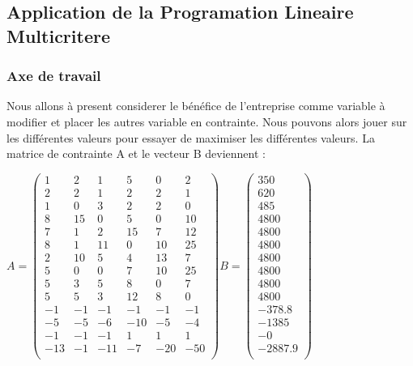 \documentclass[a4paper, 11pt]{article}
\begin{document}
\subsection{Application de la Programation Lineaire Multicritere}
\subsubsection{Axe de travail}

Nous allons à present considerer le bénéfice de l’entreprise comme variable à modifier et placer les autres variable en contrainte. Nous pouvons alors jouer sur les différentes valeurs pour essayer de maximiser les différentes valeurs.
La matrice de contrainte A et le vecteur B deviennent : 

$ A = \begin{pmatrix}
1 &2 &1 &5 &0 &2\\
2 &2 &1 &2 &2 &1\\
1 &0 &3 &2 &2 &0\\
8 &15 &0 &5 &0 &10\\
7 &1 &2 &15 &7 &12\\
8 &1 &11 &0 &10 &25\\
2 &10 &5 &4 &13 &7\\
5 &0 &0 &7 &10 &25\\
5 &3 &5 &8 &0 &7\\
5 &5 &3 &12 &8 &0\\
-1 &-1 &-1 &-1 &-1 &-1\\      %
-5 &-5 &-6 &-10 &-5 &-4\\     %
-1 &-1 &-1 &1 &1 &1\\         %
-13 &-1 &-11 &-7 &-20 &-50\\  %
 \end{pmatrix}  B = \begin{pmatrix}
350\\
620\\
485\\
4800\\
4800\\
4800\\
4800\\
4800\\
4800\\
4800\\
-378.8\\
-1385\\
-0\\
-2887.9 \\
 \end{pmatrix} $
 
\end{document}

